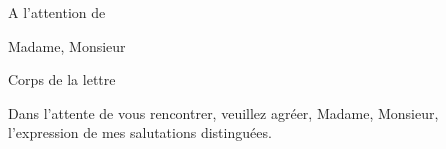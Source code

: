 \documentclass[10pt]{lettre}
\begin{document}
\begin{letter}{A l'attention de} %

\signature{Prénom \textsc{Nom}}
\address{Prénom \textsc{Nom}\\Adresse}
\nofax %


\opening{Madame, Monsieur} %

 Corps de la lettre
  
  
\closing{Dans l'attente de vous rencontrer, veuillez agréer, Madame, Monsieur, l'expression de mes salutations distinguées.} %




\end{letter}
\end{document}
